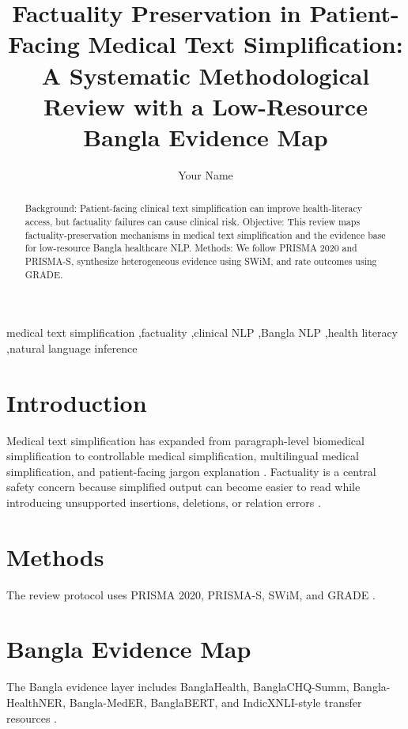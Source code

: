 \documentclass[review,authoryear]{elsarticle}
\begin{document}
\begin{frontmatter}

\title{Factuality Preservation in Patient-Facing Medical Text Simplification: A Systematic Methodological Review with a Low-Resource Bangla Evidence Map}

\author[inst1]{Your Name}
\address[inst1]{Your Institution}

\begin{abstract}
Background: Patient-facing clinical text simplification can improve health-literacy access, but factuality failures can cause clinical risk.
Objective: This review maps factuality-preservation mechanisms in medical text simplification and the evidence base for low-resource Bangla healthcare NLP.
Methods: We follow PRISMA 2020 and PRISMA-S, synthesize heterogeneous evidence using SWiM, and rate outcomes using GRADE.
\end{abstract}

\begin{keyword}
medical text simplification \sep factuality \sep clinical NLP \sep Bangla NLP \sep health literacy \sep natural language inference
\end{keyword}

\end{frontmatter}

\section{Introduction}
Medical text simplification has expanded from paragraph-level biomedical simplification to controllable medical simplification, multilingual medical simplification, and patient-facing jargon explanation \citep{devaraj2021_paragraph_level_simplification,basu2023_med_easi_finely,joseph2023_multilingual_simplification_medical,yao2024_readme_bridging_medical}. Factuality is a central safety concern because simplified output can become easier to read while introducing unsupported insertions, deletions, or relation errors \citep{devaraj2022_evaluating_factuality_text,maynez2020_faithfulness_factuality_abstractive,pagnoni2021_understanding_factuality_abstractive}.

\section{Methods}
The review protocol uses PRISMA 2020, PRISMA-S, SWiM, and GRADE \citep{page2021_prisma_2020_statement,rethlefsen2021_prisma_s_extension,campbell2020_synthesis_without_meta,guyatt2008_grade_emerging_consensus}.

\section{Bangla Evidence Map}
The Bangla evidence layer includes BanglaHealth, BanglaCHQ-Summ, Bangla-HealthNER, Bangla-MedER, BanglaBERT, and IndicXNLI-style transfer resources \citep{aziz2025_banglahealth_bengali_paraphrase,khan2023_banglachq_summ_abstractive,khan2023_nervous_about_my,islam2026_bangla_meder_multi,bhattacharjee2022_banglabert_language_pretraining,aggarwal2022_indicxnli_evaluating_multilingual}.



\end{document}
